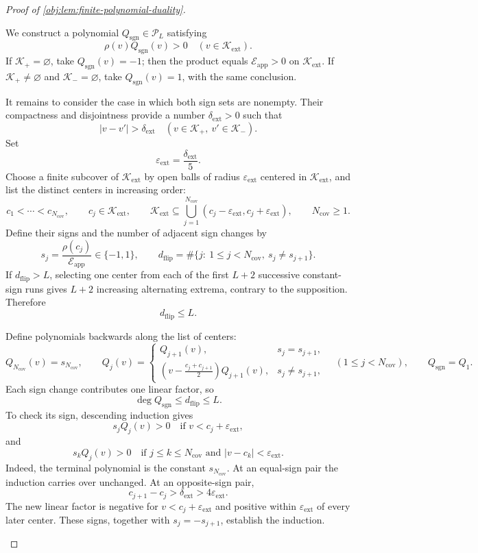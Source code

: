 \begin{proof}[Proof of \cref{obj:lem:finite-polynomial-duality}]
\begin{enumerate}
We construct a polynomial \(Q_{\mathrm{sgn}}\in\mathscr P_L\) satisfying
\[
\rho(v)Q_{\mathrm{sgn}}(v)>0
\quad(v\in\mathcal K_{\mathrm{ext}}).
\]
If \(\mathcal K_+=\varnothing\), take \(Q_{\mathrm{sgn}}(v)=-1\); then the product equals \(\mathcal E_{\mathrm{app}}>0\) on \(\mathcal K_{\mathrm{ext}}\). If \(\mathcal K_+\ne\varnothing\) and \(\mathcal K_-=\varnothing\), take \(Q_{\mathrm{sgn}}(v)=1\), with the same conclusion.

It remains to consider the case in which both sign sets are nonempty. Their compactness and disjointness provide a number \(\delta_{\mathrm{ext}}>0\) such that
\[
|v-v'|>\delta_{\mathrm{ext}}
\quad(v\in\mathcal K_+,\ v'\in\mathcal K_-).
\]
Set
\[
\varepsilon_{\mathrm{ext}}=\frac{\delta_{\mathrm{ext}}}{5}.
\]
Choose a finite subcover of \(\mathcal K_{\mathrm{ext}}\) by open balls of radius \(\varepsilon_{\mathrm{ext}}\) centered in \(\mathcal K_{\mathrm{ext}}\), and list the distinct centers in increasing order:
\[
c_1<\cdots<c_{N_{\mathrm{cov}}},
\qquad
c_j\in\mathcal K_{\mathrm{ext}},
\qquad
\mathcal K_{\mathrm{ext}}
\subseteq
\bigcup_{j=1}^{N_{\mathrm{cov}}}
(c_j-\varepsilon_{\mathrm{ext}},c_j+\varepsilon_{\mathrm{ext}}),
\qquad
N_{\mathrm{cov}}\ge1.
\]
Define their signs and the number of adjacent sign changes by
\[
s_j=\frac{\rho(c_j)}{\mathcal E_{\mathrm{app}}}\in\{-1,1\},
\qquad
d_{\mathrm{flip}}
=
\#\{j:\ 1\le j<N_{\mathrm{cov}},\ s_j\ne s_{j+1}\}.
\]
If \(d_{\mathrm{flip}}>L\), selecting one center from each of the first \(L+2\) successive constant-sign runs gives \(L+2\) increasing alternating extrema, contrary to the supposition. Therefore
\[
d_{\mathrm{flip}}\le L.
\]

Define polynomials backwards along the list of centers:
\begingroup\footnotesize
\[
Q_{N_{\mathrm{cov}}}(v)=s_{N_{\mathrm{cov}}},
\qquad
Q_j(v)=
\begin{cases}
Q_{j+1}(v),&s_j=s_{j+1},\\[2mm]
\displaystyle
\left(v-\frac{c_j+c_{j+1}}2\right)Q_{j+1}(v),
&s_j\ne s_{j+1},
\end{cases}
\quad(1\le j<N_{\mathrm{cov}}),
\qquad
Q_{\mathrm{sgn}}=Q_1.
\]
\endgroup
Each sign change contributes one linear factor, so
\[
\deg Q_{\mathrm{sgn}}\le d_{\mathrm{flip}}\le L.
\]
To check its sign, descending induction gives
\[
s_jQ_j(v)>0
\quad\text{if }v<c_j+\varepsilon_{\mathrm{ext}},
\]
and
\[
s_kQ_j(v)>0
\quad\text{if }j\le k\le N_{\mathrm{cov}}
\text{ and }|v-c_k|<\varepsilon_{\mathrm{ext}}.
\]
Indeed, the terminal polynomial is the constant \(s_{N_{\mathrm{cov}}}\). At an equal-sign pair the induction carries over unchanged. At an opposite-sign pair,
\[
c_{j+1}-c_j>\delta_{\mathrm{ext}}>4\varepsilon_{\mathrm{ext}}.
\]
The new linear factor is negative for \(v<c_j+\varepsilon_{\mathrm{ext}}\) and positive within \(\varepsilon_{\mathrm{ext}}\) of every later center. These signs, together with \(s_j=-s_{j+1}\), establish the induction.


\end{enumerate}
\end{proof}
